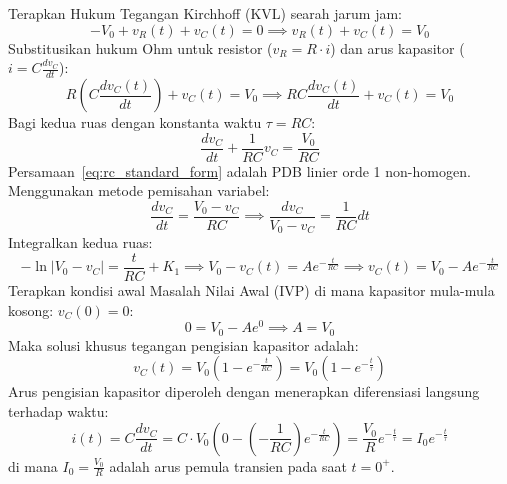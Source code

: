 \documentclass[11pt,a4paper]{article}
\theoremstyle{definition}
\begin{document}
Terapkan Hukum Tegangan Kirchhoff (KVL) searah jarum jam:
\begin{equation}
    -V_0 + v_R(t) + v_C(t) = 0 \implies v_R(t) + v_C(t) = V_0
    \label{eq:kvl_rc}
\end{equation}
Substitusikan hukum Ohm untuk resistor ($v_R = R \cdot i$) dan arus kapasitor ($i = C \frac{dv_C}{dt}$):
\begin{equation}
    R \left( C \frac{dv_C(t)}{dt} \right) + v_C(t) = V_0 \implies R C \frac{dv_C(t)}{dt} + v_C(t) = V_0
    \label{eq:rc_ode_charge}
\end{equation}
Bagi kedua ruas dengan konstanta waktu $\tau = RC$:
\begin{equation}
    \frac{dv_C}{dt} + \frac{1}{RC} v_C = \frac{V_0}{RC}
    \label{eq:rc_standard_form}
\end{equation}
Persamaan~\eqref{eq:rc_standard_form} adalah PDB linier orde 1 non-homogen. Menggunakan metode pemisahan variabel:
\begin{equation}
    \frac{dv_C}{dt} = \frac{V_0 - v_C}{RC} \implies \frac{dv_C}{V_0 - v_C} = \frac{1}{RC} dt
\end{equation}
Integralkan kedua ruas:
\begin{equation}
    -\ln|V_0 - v_C| = \frac{t}{RC} + K_1 \implies V_0 - v_C(t) = A e^{-\frac{t}{RC}} \implies v_C(t) = V_0 - A e^{-\frac{t}{RC}}
\end{equation}
Terapkan kondisi awal Masalah Nilai Awal (IVP) di mana kapasitor mula-mula kosong: $v_C(0) = 0$:
\begin{equation}
    0 = V_0 - A e^0 \implies A = V_0
\end{equation}
Maka solusi khusus tegangan pengisian kapasitor adalah:
\begin{equation}
    v_C(t) = V_0 \left( 1 - e^{-\frac{t}{RC}} \right) = V_0 \left( 1 - e^{-\frac{t}{\tau}} \right)
    \label{eq:vc_charge_solution}
\end{equation}
Arus pengisian kapasitor diperoleh dengan menerapkan diferensiasi langsung terhadap waktu:
\begin{equation}
    i(t) = C \frac{dv_C}{dt} = C \cdot V_0 \left( 0 - \left(-\frac{1}{RC}\right) e^{-\frac{t}{RC}} \right) = \frac{V_0}{R} e^{-\frac{t}{\tau}} = I_0 e^{-\frac{t}{\tau}}
    \label{eq:ic_charge_solution}
\end{equation}
di mana $I_0 = \frac{V_0}{R}$ adalah arus pemula transien pada saat $t = 0^+$.
\end{document}
